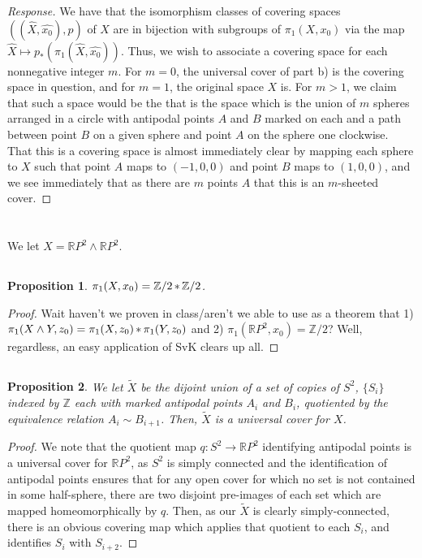 \documentclass[english]{article}
\newcommand{\RR}{\mathbb{R}}
\newcommand{\ZZ}{\mathbb{Z}}
\newcommand{\prob}[1]{\setcounter{section}{#1-1}\section{}}
\newcommand{\prt}[1]{\setcounter{subsection}{#1-1}\subsection{}}
\newtheorem*{proposition*}{Proposition}
\theoremstyle{remark}
\theoremstyle{definition}
\newcommand{\frp}{\mathop{\large {\mathlarger{*}}}}
\begin{document}
\begin{proof}[Response]
	We have that the isomorphism classes of covering spaces $((\hat{X}, \hat{x_0}),p)$ of $X$ are in bijection with subgroups of $\pi_1(X,x_0)$ via the map $\hat{X}\mapsto p_*(\pi_1(\hat{X},\hat{x_0}))$. Thus, we wish to associate a covering space for each nonnegative integer $m$. For $m=0$, the universal cover of part b) is the covering space in question, and for $m=1$, the original space $X$ is. For $m>1$, we claim that such a space would be the  that is the space which is the union of $m$ spheres arranged in a circle with antipodal points $A$ and $B$ marked on each and a path between point $B$ on a given sphere and point $A$ on the sphere one  clockwise. That this is a covering space is almost immediately clear by mapping each sphere to $X$ such that point $A$ maps to $(-1,0,0)$ and point $B$ maps to $(1,0,0)$, and we see immediately that as there are $m$ points $A$ that this is an $m$-sheeted cover. 
\end{proof}
\prob{2} We let $X=\RR P^2 \wedge \RR P^2$. 
\prt{1}\begin{proposition*}
	$\pi_1(X,x_0)=\ZZ/2\frp \ZZ/2$.
\end{proposition*}
\begin{proof}
	Wait haven't we proven in class/aren't we able to use as a theorem that 1) $\pi_1(X\wedge Y,z_0)=\pi_1(X,z_0)\frp \pi_1(Y,z_0)$ and 2) $\pi_1(\RR P^2,x_0)=\ZZ/2$? Well, regardless, an easy application of SvK clears up all.
\end{proof}
\prt{2}
\begin{proposition*}
We let $\tilde{X}$ be the dijoint union of a set of copies of $S^2$, $\{S_i\}$ indexed by $\ZZ$ each with marked antipodal points $A_i$ and $B_i$, quotiented by the equivalence relation $A_i\sim B_{i+1}$. Then, $\tilde{X}$ is a universal cover for $X$.
\end{proposition*}
\begin{proof}
	We note that the quotient map $q:S^2\to \RR P^2$ identifying antipodal points is a universal cover for $\RR P^2$, as $S^2$ is simply connected and the identification of antipodal points ensures that for any open cover for which no set is not contained in some half-sphere, there are two disjoint pre-images of each set which are mapped homeomorphically by $q$. Then, as our $\tilde{X}$ is clearly simply-connected, there is an obvious covering map which applies that quotient to each $S_i$, and identifies $S_{i}$ with $S_{i+2}$.
\end{proof}
\end{document}
